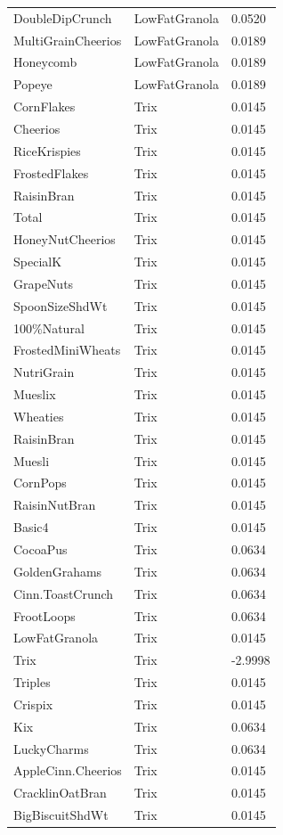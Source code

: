 \begin{table}[!htbp]
\begin{tabular}{lll}
DoubleDipCrunch & LowFatGranola & 0.0520
\\
MultiGrainCheerios & LowFatGranola & 0.0189
\\
Honeycomb & LowFatGranola & 0.0189
\\
Popeye & LowFatGranola & 0.0189
\\
CornFlakes & Trix & 0.0145
\\
Cheerios & Trix & 0.0145
\\
RiceKrispies & Trix & 0.0145
\\
FrostedFlakes & Trix & 0.0145
\\
RaisinBran & Trix & 0.0145
\\
Total & Trix & 0.0145
\\
HoneyNutCheerios & Trix & 0.0145
\\
SpecialK & Trix & 0.0145
\\
GrapeNuts & Trix & 0.0145
\\
SpoonSizeShdWt & Trix & 0.0145
\\
100\%Natural & Trix & 0.0145
\\
FrostedMiniWheats & Trix & 0.0145
\\
NutriGrain & Trix & 0.0145
\\
Mueslix & Trix & 0.0145
\\
Wheaties & Trix & 0.0145
\\
RaisinBran & Trix & 0.0145
\\
Muesli & Trix & 0.0145
\\
CornPops & Trix & 0.0145
\\
RaisinNutBran & Trix & 0.0145
\\
Basic4 & Trix & 0.0145
\\
CocoaPus & Trix & 0.0634
\\
GoldenGrahams & Trix & 0.0634
\\
Cinn.ToastCrunch & Trix & 0.0634
\\
FrootLoops & Trix & 0.0634
\\
LowFatGranola & Trix & 0.0145
\\
Trix & Trix & -2.9998
\\
Triples & Trix & 0.0145
\\
Crispix & Trix & 0.0145
\\
Kix & Trix & 0.0634
\\
LuckyCharms & Trix & 0.0634
\\
AppleCinn.Cheerios & Trix & 0.0145
\\
CracklinOatBran & Trix & 0.0145
\\
BigBiscuitShdWt & Trix & 0.0145

\end{tabular}
\end{table}
